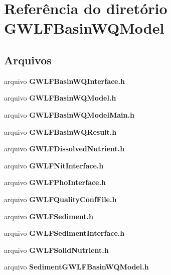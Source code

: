 \section{Referência do diretório G\+W\+L\+F\+Basin\+W\+Q\+Model}
\label{dir_c3d6ba7526675c19689624aa379dcef6}
\subsection*{Arquivos}
\begin{DoxyCompactItemize}
\item 
arquivo {\bf G\+W\+L\+F\+Basin\+W\+Q\+Interface.\+h}
\item 
arquivo {\bf G\+W\+L\+F\+Basin\+W\+Q\+Model.\+h}
\item 
arquivo {\bf G\+W\+L\+F\+Basin\+W\+Q\+Model\+Main.\+h}
\item 
arquivo {\bf G\+W\+L\+F\+Basin\+W\+Q\+Result.\+h}
\item 
arquivo {\bf G\+W\+L\+F\+Dissolved\+Nutrient.\+h}
\item 
arquivo {\bf G\+W\+L\+F\+Nit\+Interface.\+h}
\item 
arquivo {\bf G\+W\+L\+F\+Pho\+Interface.\+h}
\item 
arquivo {\bf G\+W\+L\+F\+Quality\+Conf\+File.\+h}
\item 
arquivo {\bf G\+W\+L\+F\+Sediment.\+h}
\item 
arquivo {\bf G\+W\+L\+F\+Sediment\+Interface.\+h}
\item 
arquivo {\bf G\+W\+L\+F\+Solid\+Nutrient.\+h}
\item 
arquivo {\bf Sediment\+G\+W\+L\+F\+Basin\+W\+Q\+Model.\+h}
\end{DoxyCompactItemize}
